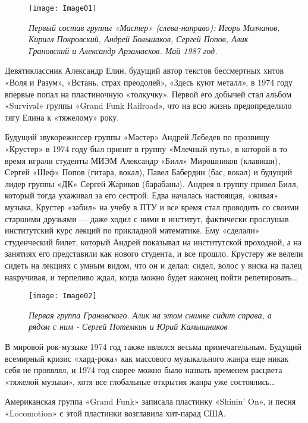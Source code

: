 \documentclass[16pt,a5paper,oneside]{book}
\begin{document}
\begin{figure}
    \centering
    \texttt{[image: Image01]}
    \caption{\textit{
        Первый состав группы «Мастер» (слева-направо): Игорь Молчанов, Кирилл Покровский, Андрей Большаков, Сергей
        Попов, Алик Грановский и Александр Арзамасков. Май 1987 год.
    }}
\end{figure}

Девятиклассник Александр Елин, будущий автор текстов бессмертных хитов «Воля и Разум», «Встань, страх преодолей»,
«Здесь куют металл», в 1974 году впервые попал на пластиночную «толкучку». Первой его добычей стал альбом «Survival»
группы «Grand Funk Railroad», что на всю жизнь предопределило тягу Елина к «тяжелому» року.

Будущий звукорежиссер группы «Мастер» Андрей Лебедев по прозвищу «Крустер» в 1974 году был принят в группу «Млечный
путь», в которой в то время играли студенты МИЭМ Александр «Билл» Мирошников (клавиши), Сергей «Шеф» Попов (гитара,
вокал), Павел Бабердин (бас, вокал) и будущий лидер группы «ДК» Сергей Жариков (барабаны). Андрея в группу привел Билл,
который тогда ухаживал за его сестрой. Едва началась настоящая, «живая» музыка, Крустер «забил» на учебу в ПТУ и все
время стал проводить со своими старшими друзьями — даже ходил с ними в институт, фактически прослушав институтский курс
лекций по прикладной математике. Ему «сделали» студенческий билет, который Андрей показывал на институтской проходной,
а на занятиях его представили как нового студента, и все прошло. Крустеру же велели сидеть на лекциях с умным видом, что
он и делал: сидел, волос у виска на палец накручивая, и терпеливо ждал, когда можно будет наконец пойти
репетировать\ldots

\begin{wrapfigure}{L}{0.5\textwidth}
    \centering
    \texttt{[image: Image02]}
    \caption{\textit{
        Первая группа Грановского. Алик на этом снимке сидит справа, а рядом с ним - Сергей Потемкин и Юрий Камышников
    }}
\end{wrapfigure}

В мировой рок-музыке 1974 год также являлся весьма примечательным. Будущий всемирный кризис «хард-рока» как массового
музыкального жанра еще никак себя не проявлял, и 1974 год скорее можно было назвать временем расцвета «тяжелой музыки»,
хотя все глобальные открытия жанра уже состоялись\ldots

Американская группа «Grand Funk» записала пластинку «Shinin' On», и песня «Locomotion» с этой пластинки возглавила
хит-парад США.
\end{document}
